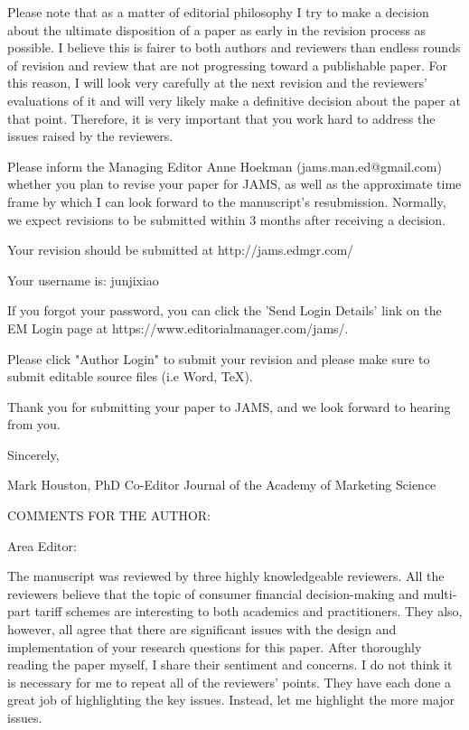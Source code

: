 \documentclass[titlepage,12pt,letterpaper]{article}
\numberwithin{equation}{section}
\begin{document}
Please note that as a matter of editorial philosophy I try to make a decision about the ultimate disposition of a paper as early in the revision process as possible. I believe this is fairer to both authors and reviewers than endless rounds of revision and review that are not progressing toward a publishable paper. For this reason, I will look very carefully at the next revision and the reviewers' evaluations of it and will very likely make a definitive decision about the paper at that point. Therefore, it is very important that you work hard to address the issues raised by the reviewers.

Please inform the Managing Editor Anne Hoekman (jams.man.ed@gmail.com) whether you plan to revise your paper for JAMS, as well as the approximate time frame by which I can look forward to the manuscript's resubmission.  Normally, we expect revisions to be submitted within 3 months after receiving a decision.

Your revision should be submitted at http://jams.edmgr.com/


Your username is: junjixiao

If you forgot your password, you can click the 'Send Login Details' link on the EM Login page at https://www.editorialmanager.com/jams/.

Please click "Author Login" to submit your revision and please make sure to submit editable source files (i.e Word, TeX).

Thank you for submitting your paper to JAMS, and we look forward to hearing from you.

Sincerely,  

Mark Houston, PhD
Co-Editor
Journal of the Academy of Marketing Science



COMMENTS FOR THE AUTHOR:




Area Editor:

The manuscript was reviewed by three highly knowledgeable reviewers. All the reviewers believe that the topic of consumer financial decision-making and multi-part tariff schemes are interesting to both academics and practitioners. They also, however, all agree that there are significant issues with the design and implementation of your research questions for this paper. After thoroughly reading the paper myself, I share their sentiment and concerns. I do not think it is necessary for me to repeat all of the reviewers’ points. They have each done a great job of highlighting the key issues. Instead, let me highlight the more major issues.
\end{document}
